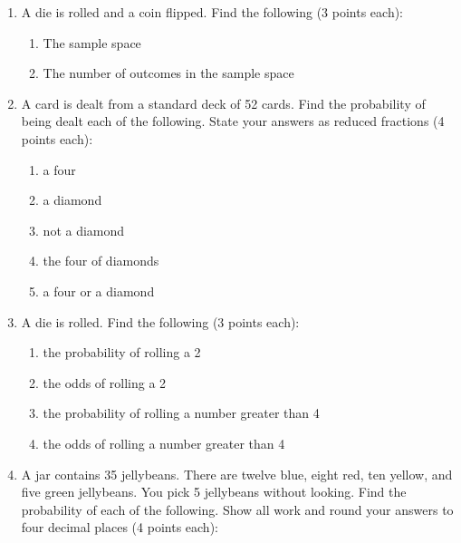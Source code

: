 \documentclass[12pt]{article}
\begin{document}
\begin{enumerate}
\item A die is rolled and a coin flipped.  Find the following (3 points each):
\begin{enumerate}
\item The sample space
\vspace{.9 in}
\item The number of outcomes in the sample space
\vspace{.7 in}
\end{enumerate}

\item A card is dealt from a standard deck of 52 cards.  Find the probability of being dealt each of the following.  State your answers as reduced fractions (4 points each):
\begin{enumerate}
\item a four
\vspace{.4 in}
\item a diamond
\vspace{.4 in}
\item not a diamond
\vspace{.4 in}
\item the four of diamonds
\vspace{.4 in}
\item a four or a diamond
\vspace{.4 in}

\end{enumerate}

\item A die is rolled.  Find the following (3 points each):
\begin{enumerate}
\item the probability of rolling a 2
\vspace{.5 in}
\item the odds of rolling a 2
\vspace{.5 in}
\item the probability of rolling a number greater than 4
\vspace{.5 in}
\item the odds of rolling a number greater than 4
\vspace{.5 in}
\end{enumerate}



\item
A jar contains 35 jellybeans.  There are twelve blue, eight red, ten yellow, and five green jellybeans.  You pick 5 jellybeans without looking.  Find the probability of each of the following.  Show all work and round your answers to four decimal places (4 points each):


\end{enumerate}
\end{document}
